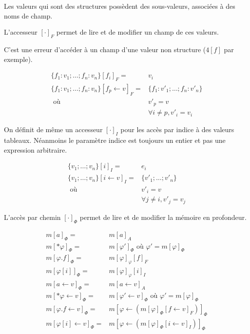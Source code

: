 \begin{definition}

  Les valeurs qui sont des structures possèdent des sous-valeurs, associées à
  des noms de champ.

  L'accesseur $[ \cdot ]_F$ permet de lire et de modifier un champ de ces
  valeurs.

  C'est une erreur d'accéder à un champ d'une valeur non structure ($4[f]$ par
  exemple).

  \begin{align*}
    \{ f_1 : v_1; … ; f_n : v_n \}[f_i]_F = & v_i \\
    \{ f_1 : v_1; … ; f_n : v_n \}[f_p ← v]_F = & \{ f_1 : v'_1; … ; f_n : v'_n \} \\
          \mbox{ où } & v'_p = v \\
                      & ∀ i ≠ p, v'_i = v_i
  \end{align*}

\end{definition}

\begin{definition}

  On définit de même un accesseur $[\cdot]_I$ pour les accès par indice à des
  valeurs tableaux. Néanmoins le paramètre indice est toujours un entier et pas
  une expression arbitraire.

  \begin{align*}
    \{ v_1 ; … ; v_n \} [i]_I   = & e_i \\
    \{ v_1 ; … ; v_n \} [i←v]_I = & \{ v'_1 ; … ; v'_n \} \\
                      \mbox{ où } & v'_i = v \\
                                  & ∀j≠i, v'_j = v_j
  \end{align*}

\end{definition}

\begin{definition}

  L'accès par chemin $[\cdot]_Φ$ permet de lire et de modifier la mémoire en
  profondeur.

  \begin{align*}
    m[a]_Φ        = & m[a]_A \\
    m[*φ]_Φ       = & m[φ']_Φ \mbox{ où } φ' = m[φ]_Φ \\
    m[φ.f]_Φ      = & m[φ]_φ[f]_F \\
    m[φ[i]]_Φ     = & m[φ]_φ[i]_I \\
    m[a ← v]_Φ    = & m[a ← v]_A \\
    m[*φ ← v]_Φ   = & m[φ' ← v]_Φ \mbox{ où } φ' = m[φ]_Φ \\
    m[φ.f ← v]_Φ  = & m[φ ← (m[φ]_Φ[f←v]_F)]_Φ \\
    m[φ[i] ← v]_Φ = & m[φ ← (m[φ]_Φ[i←v]_I)]_Φ
  \end{align*}

\end{definition}

